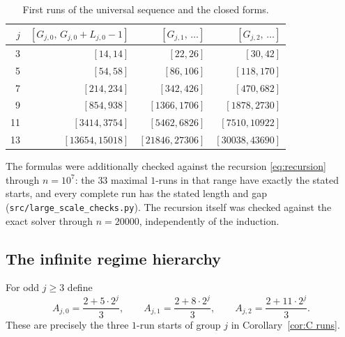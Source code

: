 \begin{table}[h]
\centering
\caption{First runs of the universal sequence and the closed forms.}\label{tab:Cruns}
\begin{tabular}{rrrr}
\toprule
$j$ & $[G_{j,0},\,G_{j,0}+L_{j,0}-1]$ & $[G_{j,1},\,\dots]$ & $[G_{j,2},\,\dots]$\\
\midrule
3 & $[14,14]$ & $[22,26]$ & $[30,42]$\\
5 & $[54,58]$ & $[86,106]$ & $[118,170]$\\
7 & $[214,234]$ & $[342,426]$ & $[470,682]$\\
9 & $[854,938]$ & $[1366,1706]$ & $[1878,2730]$\\
11 & $[3414,3754]$ & $[5462,6826]$ & $[7510,10922]$\\
13 & $[13654,15018]$ & $[21846,27306]$ & $[30038,43690]$\\
\bottomrule
\end{tabular}
\end{table}

The formulas were additionally checked against the recursion \eqref{eq:recursion} through $n=10^{7}$: the $33$ maximal $1$-runs in that range have exactly the stated starts, and every complete run has the stated length and gap (\texttt{src/large\_scale\_checks.py}). The recursion itself was checked against the exact solver through $n=20000$, independently of the induction.

\subsection{The infinite regime hierarchy}\label{sec:Chierarchy}
For odd $j\ge3$ define
\[
A_{j,0}=\frac{2+5\cdot2^{j}}{3},\qquad
A_{j,1}=\frac{2+8\cdot2^{j}}{3},\qquad
A_{j,2}=\frac{2+11\cdot2^{j}}{3}.
\]
These are precisely the three $1$-run starts of group $j$ in Corollary~\ref{cor:C runs}.

